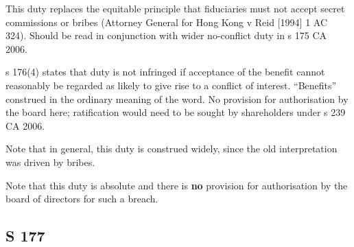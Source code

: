 \documentclass[
]{article}
\begin{document}
This duty replaces the equitable principle that fiduciaries must not
accept secret commissions or bribes (Attorney General for Hong Kong v
Reid {[}1994{]} 1 AC 324). Should be read in conjunction with wider
no-conflict duty in s 175 CA 2006.

s 176(4) states that duty is not infringed if acceptance of the benefit
cannot reasonably be regarded as likely to give rise to a conflict of
interest. ``Benefits'' construed in the ordinary meaning of the word. No
provision for authorisation by the board here; ratification would need
to be sought by shareholders under s 239 CA 2006.

Note that in general, this duty is construed widely, since the old
interpretation was driven by bribes.

Note that this duty is absolute and there is \textbf{no} provision for
authorisation by the board of directors for such a breach.

\hypertarget{s-177}{%
\subsection{S 177}\label{s-177}}
\end{document}
